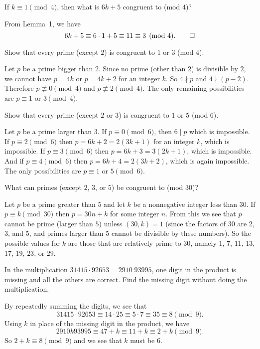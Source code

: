  If $k\equiv1\pmod4$, then what is $6k+5$ congruent to (mod
$4$)?
\begin{solution}
  From Lemma~1, we have
  \begin{equation*}
    6k+5\equiv6\cdot1+5\equiv11\equiv3\pmod4. \qedhere
  \end{equation*}
\end{solution}

 Show that every prime (except $2$) is congruent to $1$ or
$3$ (mod $4$).
\begin{solution}
  Let $p$ be a prime bigger than $2$. Since no prime (other than $2$)
  is divisible by $2$, we cannot have $p = 4k$ or $p = 4k + 2$ for an
  integer $k$. So $4\nmid p$ and $4\nmid(p-2)$. Therefore
  $p\not\equiv0\pmod4$ and $p\not\equiv2\pmod4$. The only remaining
  possibilities are $p\equiv1$ or $3\pmod4$.
\end{solution}

 Show that every prime (except $2$ or $3$) is congruent to
$1$ or $5$ (mod $6$).
\begin{solution}
  Let $p$ be a prime larger than $3$. If $p\equiv0\pmod6$, then
  $6\mid p$ which is impossible. If $p\equiv2\pmod6$ then
  $p = 6k + 2 = 2(3k + 1)$ for an integer $k$, which is impossible. If
  $p\equiv3\pmod6$ then $p = 6k + 3 = 3(2k + 1)$, which is
  impossible. And if $p\equiv4\pmod6$ then $p = 6k + 4 = 2(3k + 2)$,
  which is again impossible. The only possibilities are $p\equiv1$ or
  $5\pmod6$.
\end{solution}

 What can primes (except $2$, $3$, or $5$) be congruent to
(mod $30$)?
\begin{solution}
  Let $p$ be a prime greater than $5$ and let $k$ be a nonnegative
  integer less than $30$. If $p\equiv k\pmod{30}$ then $p = 30n + k$
  for some integer $n$. From this we see that $p$ cannot be prime
  (larger than $5$) unless $(30,k) = 1$ (since the factors of $30$ are
  $2$, $3$, and $5$, and primes larger than $5$ cannot be divisible by
  these numbers). So the possible values for $k$ are those that are
  relatively prime to $30$, namely $1$, $7$, $11$, $13$, $17$, $19$,
  $23$, or $29$.
\end{solution}

 In the multiplication $31415\cdot92653 = 2910\;93995$,
one digit in the product is missing and all the others are
correct. Find the missing digit without doing the multiplication.
\begin{solution}
  By repeatedly summing the digits, we see that
  \begin{equation*}
    31415\cdot92653\equiv14\cdot25\equiv5\cdot7\equiv35\equiv8\pmod9.
  \end{equation*}
  Using $k$ in place of the missing digit in the product, we have
  \begin{equation*}
    2910k93995 \equiv 47+k\equiv 11+k\equiv2+k\pmod9.
  \end{equation*}
  So $2+k\equiv8\pmod9$ and we see that $k$ must be $6$.
\end{solution}

